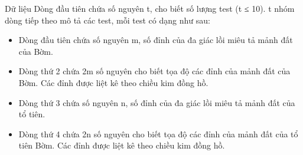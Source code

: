 Dữ liệu  
Dòng đầu tiên chứa số nguyên t, cho biết số lượng test (t ≤ 10). t nhóm dòng tiếp theo mô tả các test, mỗi test có dạng như sau:  
\begin{itemize}
	\item     Dòng đầu tiên chứa số nguyên m, số đỉnh của đa giác lồi miêu tả mảnh đất của Bờm.   
	\item     Dòng thứ 2 chứa 2m số nguyên cho biết tọa độ các đỉnh của mảnh đất của Bờm. Các đỉnh được liệt kê theo chiều kim đồng hồ.   
	\item     Dòng thứ 3 chứa số nguyên n, số đỉnh của đa giác lồi miêu tả mảnh đất của tổ tiên.   
	\item     Dòng thứ 4 chứa 2n số nguyên cho biết tọa độ các đỉnh của mảnh đất của tổ tiên Bờm. Các đỉnh được liệt kê theo chiều kim đồng hồ.   
\end{itemize}